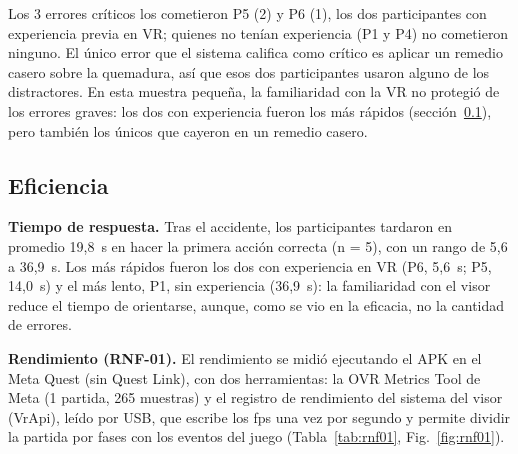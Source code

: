 \documentclass[11pt,a4paper]{article}
\begin{document}
Los 3 errores críticos los cometieron P5 (2) y P6 (1), los dos participantes con experiencia previa en VR; quienes no tenían experiencia (P1 y P4) no cometieron ninguno. El único error que el sistema califica como crítico es aplicar un remedio casero sobre la quemadura, así que esos dos participantes usaron alguno de los distractores. En esta muestra pequeña, la familiaridad con la VR no protegió de los errores graves: los dos con experiencia fueron los más rápidos (sección~\ref{sec:eficiencia}), pero también los únicos que cayeron en un remedio casero.

\subsection{Eficiencia}\label{sec:eficiencia}
\textbf{Tiempo de respuesta.} Tras el accidente, los participantes tardaron en promedio 19,8~s en hacer la primera acción correcta (n = 5), con un rango de 5,6 a 36,9~s. Los más rápidos fueron los dos con experiencia en VR (P6, 5,6~s; P5, 14,0~s) y el más lento, P1, sin experiencia (36,9~s): la familiaridad con el visor reduce el tiempo de orientarse, aunque, como se vio en la eficacia, no la cantidad de errores.

\textbf{Rendimiento (RNF-01).} El rendimiento se midió ejecutando el APK en el Meta Quest (sin Quest Link), con dos herramientas: la OVR Metrics Tool de Meta (1 partida, 265 muestras) y el registro de rendimiento del sistema del visor (VrApi), leído por USB, que escribe los fps una vez por segundo y permite dividir la partida por fases con los eventos del juego (Tabla~\ref{tab:rnf01}, Fig.~\ref{fig:rnf01}).
\end{document}
